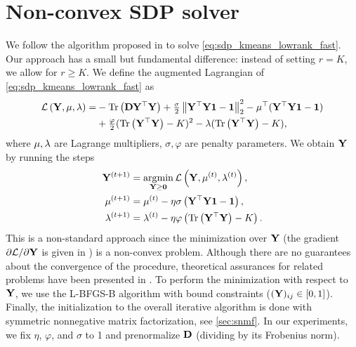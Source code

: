 \documentclass[twoside,11pt]{article}
\begin{document}
\section{Non-convex SDP solver}
\label{sec:burer-monteiro}

We follow the algorithm proposed in \cite{Kulis2007,Hou2015} to solve \cref{eq:sdp_kmeans_lowrank_fast}. Our approach has a small but fundamental difference: instead of setting $r = K$, we allow for $r \geq K$.
We define the augmented Lagrangian of \cref{eq:sdp_kmeans_lowrank_fast} as
\begin{equation}
\begin{aligned}
\mathcal{L} \left( {\mathbf{Y}}, {\mathbf{\mu}}, \lambda \right) =
& -\operatorname{Tr}\left({\mathbf{D}} {{\mathbf{Y}}}^\top {\mathbf{Y}}\right)
+ \tfrac{\sigma}{2} \left\| {{\mathbf{Y}}}^\top {\mathbf{Y}} {\mathbf{1}} - {\mathbf{1}} \right\|_{2}^2
- {{\mathbf{\mu}}}^\top ({{\mathbf{Y}}}^\top {\mathbf{Y}} {\mathbf{1}} - {\mathbf{1}}) \\
& + \tfrac{\varphi}{2} (\operatorname{Tr}\left({{\mathbf{Y}}}^\top {\mathbf{Y}}\right) - K)^2
- {\mathbf{\lambda}} (\operatorname{Tr}\left({{\mathbf{Y}}}^\top {\mathbf{Y}}\right) - K) ,
\end{aligned}
\end{equation}
where ${\mathbf{\mu}}, {\mathbf{\lambda}}$ are Lagrange multipliers, $\sigma, \varphi$ are penalty parameters.
We obtain ${\mathbf{Y}}$ by running the steps
\begin{subequations}
	\begin{align}
		{\mathbf{Y}}^{(t+1)} &= \operatorname*{\arg\!\min}_{{\mathbf{Y}} \geq {\mathbf{0}}} \mathcal{L} \left( {\mathbf{Y}}, {\mathbf{\mu}}^{(t)}, \lambda^{(t)} \right) ,\\
		{\mathbf{\mu}}^{(t+1)} &= {\mathbf{\mu}}^{(t)} - \eta \sigma \left( {{\mathbf{Y}}}^\top {\mathbf{Y}} {\mathbf{1}} - {\mathbf{1}} \right) ,\\
		\lambda^{(t+1)} &= \lambda^{(t)} - \eta \varphi \left( \operatorname{Tr}\left({{\mathbf{Y}}}^\top {\mathbf{Y}}\right) - K \right) .
	\end{align}
\end{subequations}
This is a non-standard approach since the minimization over ${\mathbf{Y}}$ (the gradient $\partial \mathcal{L} / \partial {\mathbf{Y}}$ is given in \cite{Hou2015}) is a non-convex problem.
Although there are no guarantees about the convergence of the procedure, theoretical assurances for related problems have been presented in \cite{boumal2016non}.
To perform the minimization with respect to ${\mathbf{Y}}$, we use the L-BFGS-B algorithm \citep{Byrd1995} with bound constraints ($({\mathbf{Y}})_{ij} \in [0, 1]$). Finally, the initialization to the overall iterative algorithm is done with symmetric nonnegative matrix factorization, see \cref{sec:snmf}.
In our experiments, we fix $\eta$, $\varphi$, and $\sigma$ to 1 and prenormalize ${\mathbf{D}}$ (dividing by its Frobenius norm).
\end{document}
